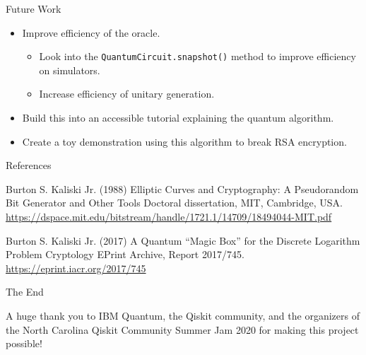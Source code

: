 \documentclass{beamer}
\begin{document}

\begin{frame}{Future Work}

\begin{itemize}
    \item Improve efficiency of the oracle.
    \begin{itemize}
        \item Look into the \texttt{QuantumCircuit.snapshot()} method to improve efficiency on simulators.
        \item Increase efficiency of unitary generation.
    \end{itemize}
    \item Build this into an accessible tutorial explaining the quantum algorithm.
    \item Create a toy demonstration using this algorithm to break RSA encryption.
\end{itemize}
    
\end{frame}


\begin{frame}{References}
\footnotesize{}
\begin{thebibliography}{99}

 Burton S. Kaliski Jr. (1988)
\newblock Elliptic Curves and Cryptography: A Pseudorandom Bit Generator and Other Tools
\newblock Doctoral dissertation, MIT, Cambridge, USA.
\newblock \href{https://dspace.mit.edu/bitstream/handle/1721.1/14709/18494044-MIT.pdf}{https://dspace.mit.edu/bitstream/handle/1721.1/14709/18494044-MIT.pdf}

 Burton S. Kaliski Jr. (2017)
\newblock A Quantum ``Magic Box'' for the Discrete Logarithm Problem
\newblock Cryptology EPrint Archive, Report 2017/745.
\newblock \href{https://eprint.iacr.org/2017/745}{https://eprint.iacr.org/2017/745}

\end{thebibliography}

\end{frame}


\begin{frame}
\huge{\centerline{The End}}

\begin{center}
{\large A huge thank you to IBM Quantum, the Qiskit community, and the organizers of the North Carolina Qiskit Community Summer Jam 2020 for making this project possible!}
\end{center}

\end{frame}

\end{document}
